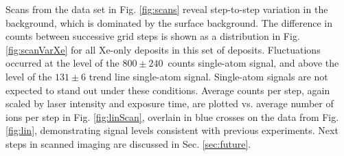 Scans from the data set in Fig. \ref{fig:scans} reveal step-to-step variation in the background, which is dominated by the surface background.  The difference in counts between successive grid steps is shown as a distribution in Fig.\ref{fig:scanVarXe} for all Xe-only deposits in this set of deposits.  Fluctuations occurred at the level of the $800 \pm 240$~counts single-atom signal, and above the level of the $131 \pm 6$ trend line single-atom signal.  Single-atom signals are not expected to stand out under these conditions.  Average counts per step, again scaled by laser intensity and exposure time, are plotted vs. average number of ions per step in Fig. \ref{fig:linScan}, overlain in blue crosses on the data from Fig. \ref{fig:lin}, demonstrating signal levels consistent with previous experiments.  Next steps in scanned imaging are discussed in Sec. \ref{sec:future}.


